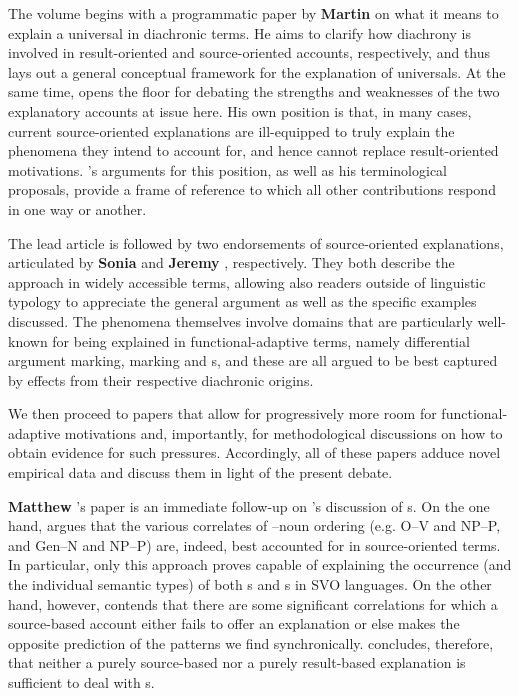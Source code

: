 \documentclass[output=paper]{langsci/langscibook}
\begin{document}
The volume begins with a programmatic paper by \textbf{Martin } on what it means to explain a universal in diachronic terms. He aims to clarify how diachrony is involved in result-oriented and source-oriented accounts, respectively, and thus lays out a general conceptual framework for the explanation of universals. At the same time,  opens the floor for debating the strengths and weaknesses of the two explanatory accounts at issue here. His own position is that, in many cases, current source-oriented explanations are ill-equipped to truly explain the phenomena they intend to account for, and hence cannot replace result-oriented motivations. ’s arguments for this position, as well as his terminological proposals, provide a frame of reference to which all other contributions respond in one way or another.

The lead article is followed by two endorsements of source-oriented explanations, articulated by \textbf{Sonia } and \textbf{Jeremy }, respectively. They both describe the approach in widely accessible terms, allowing also readers outside of linguistic typology to appreciate the general argument as well as the specific examples discussed. The phenomena themselves involve domains that are particularly well-known for being explained in functional-adaptive terms, namely differential argument marking,  marking and s, and these are all argued to be best captured by  effects from their respective diachronic origins.  

We then proceed to papers that allow for progressively more room for func\-tion\-al-adaptive motivations and, importantly, for methodological discussions on how to obtain evidence for such pressures. Accordingly, all of these papers adduce novel empirical data and discuss them in light of the present debate.

\textbf{Matthew }’s paper is an immediate follow-up on ’s discussion of s. On the one hand,  argues that the various correlates of –noun ordering (e.g. O–V and NP–P, and Gen–N and NP–P) are, indeed, best accounted for in source-oriented terms. In particular, only this approach proves capable of explaining the occurrence (and the individual semantic types) of both s and s in SVO languages. On the other hand, however,  contends that there are some significant correlations for which a source-based account either fails to offer an explanation or else makes the opposite prediction of the patterns we find synchronically.  concludes, therefore, that neither a purely source-based nor a purely result-based explanation is sufficient to deal with s.      
\end{document}
